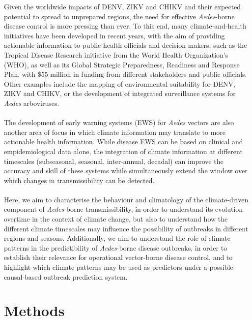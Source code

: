 \documentclass[10pt,twocolumn]{wlscirep}
\begin{document}
Given the worldwide impacts of DENV, ZIKV and CHIKV and their expected potential to spread to unprepared regions, the need for effective \textit{Aedes}-borne disease control is more pressing than ever. To this end, many climate-and-health initiatives have been developed in recent years, with the aim of providing actionable information to public health officials and decision-makers, such as the Tropical Disease Research initiative from the World Health Organization's (WHO)\cite{keating_2023, ramirez_2017}, as well as its Global Strategic Preparedness, Readiness and Response Plan, with \$55 million in funding from different stakeholders and public officials. Other examples include the mapping of environmental suitability for DENV, ZIKV and CHIKV\cite{munoz_2020b, guerra_2025}, or the development of integrated surveillance systems for \textit{Aedes} arboviruses\cite{leandro_2024}.
\\
\\
The development of early warning systems (EWS) for \textit{Aedes} vectors are also another area of focus in which climate information may translate to more actionable health information\cite{ropelewski_1985}. While disease EWS can be based on clinical and empidemiological data alone, the integration of climate information at different timescales (subseasonal, seasonal, inter-annual, decadal) can improve the accuracy and skill of these systems while simultaneously extend the window over which changes in transmissibility can be detected\cite{thomson_2006, cox_2007}.
\\
\\
Here, we aim to characterise the behaviour and climatology of the climate-driven component of \textit{Aedes}-borne transmissibility, in order to understand its evolution overtime in the context of climate change, but also to understand how the different climate timescales may influence the possibility of outbreaks in different regions and seasons. Additionally, we aim to understand the role of climate patterns in the predictibility of \textit{Aedes}-borne disease outbreaks, in order to establish their relevance for operational vector-borne disease control, and to highlight which climate patterns may be used as predictors under a possible causal-based outbreak prediction system.

\section{Methods} \label{sec-methods}
\end{document}
